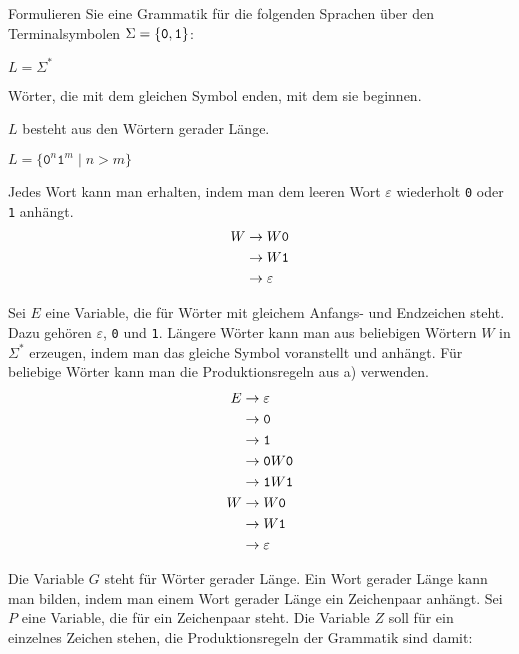 Formulieren Sie eine Grammatik für die folgenden Sprachen über
den Terminalsymbolen $\Sigma=\{{\tt 0},{\tt 1}\}$:
\begin{teilaufgaben}
\item $L=\Sigma^*$
\item Wörter, die mit dem gleichen Symbol enden, mit dem sie beginnen.
\item $L$ besteht aus den Wörtern gerader Länge.
\item $L=\{\texttt{0}^n\texttt{1}^m\;|\;n>m\}$
\end{teilaufgaben}


\begin{loesung}
\begin{teilaufgaben}
\item
Jedes Wort kann man erhalten, indem man dem leeren Wort $\varepsilon$
wiederholt {\tt 0} oder {\tt 1} anhängt.
\begin{align*}
W&\rightarrow W{\tt 0}\\
 &\rightarrow W{\tt 1}\\
 &\rightarrow\varepsilon
\end{align*}
\item Sei $E$ eine Variable, die für Wörter mit gleichem Anfangs-
und Endzeichen steht. Dazu gehören $\varepsilon$, {\tt 0} und {\tt 1}.
Längere
Wörter kann man aus beliebigen Wörtern $W$ in $\Sigma^*$ erzeugen,
indem man das gleiche Symbol voranstellt und anhängt. Für beliebige
Wörter kann
man die Produktionsregeln aus a) verwenden.
\begin{align*}
E&\rightarrow \varepsilon\\
 &\rightarrow {\tt 0}\\
 &\rightarrow {\tt 1}\\
 &\rightarrow {\tt 0}W{\tt 0}\\
 &\rightarrow {\tt 1}W{\tt 1}\\
W&\rightarrow W{\tt 0}\\
 &\rightarrow W{\tt 1}\\
 &\rightarrow\varepsilon
\end{align*}
\item Die Variable $G$ steht für Wörter gerader Länge. Ein Wort
gerader Länge kann man bilden, indem man einem Wort gerader Länge
ein Zeichenpaar anhängt. Sei $P$ eine Variable, die für ein Zeichenpaar
steht. Die Variable $Z$ soll für ein einzelnes Zeichen stehen, die
Produktionsregeln der Grammatik sind damit:
\begin{align*}

\end{align*}
\end{teilaufgaben}
\end{loesung}
